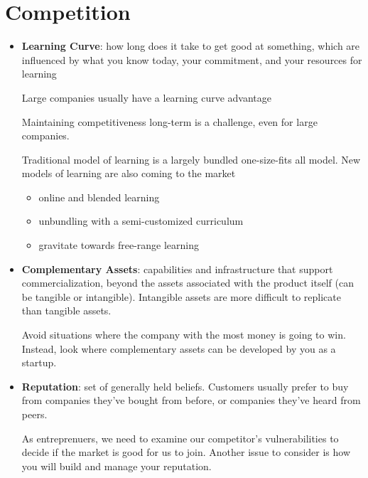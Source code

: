 \documentclass{article}
\begin{document}
  \section{Competition}
  \begin{itemize}
    \item \textbf{Learning Curve}: how long does it take to get good at something, which are influenced by what you know today, your commitment, and your resources for learning

      Large companies usually have a learning curve advantage

      Maintaining competitiveness long-term is a challenge, even for large companies.

      Traditional model of learning is a largely bundled one-size-fits all model. New models of learning are also coming to the market
      \begin{itemize}
        \item online and blended learning
        \item unbundling with a semi-customized curriculum
        \item gravitate towards free-range learning
      \end{itemize}
    \item \textbf{Complementary Assets}: capabilities and infrastructure that support commercialization, beyond the assets associated with the product itself (can be tangible or intangible). Intangible assets are more difficult to replicate than tangible assets.

      Avoid situations where the company with the most money is going to win. Instead, look where complementary assets can be developed by you as a startup.
    \item \textbf{Reputation}: set of generally held beliefs. Customers usually prefer to buy from companies they've bought from before, or companies they've heard from peers.

      As entreprenuers, we need to examine our competitor's vulnerabilities to decide if the market is good for us to join. Another issue to consider is how you will build and manage your reputation.
  \end{itemize}
\end{document}
